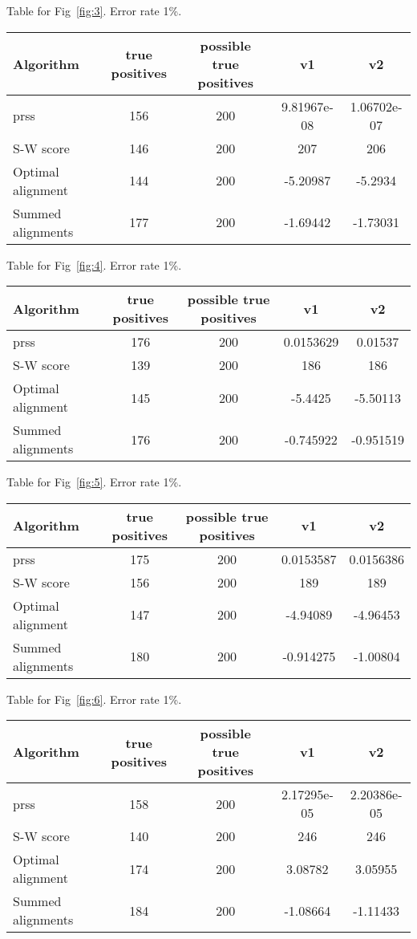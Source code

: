 \documentclass[a4paper,10pt,oneside]{article}
\begin{document}
Table for Fig~\ref{fig:3}. Error rate 1\%.
\begin{tabular}{|l|c|c|c|c|} \hline
Algorithm & true positives & possible true positives & v1 & v2 \\ \hline
prss & 156 & 200 & 9.81967e-08 & 1.06702e-07 \\
S-W score & 146 & 200 & 207 & 206 \\
Optimal alignment & 144 & 200 & -5.20987 & -5.2934 \\
Summed alignments & 177 & 200 & -1.69442 & -1.73031 \\\hline
\end{tabular}

Table for Fig~\ref{fig:4}. Error rate 1\%.
\begin{tabular}{|l|c|c|c|c|} \hline
Algorithm & true positives & possible true positives & v1 & v2 \\ \hline
prss & 176 & 200 & 0.0153629 & 0.01537 \\
S-W score & 139 & 200 & 186 & 186 \\
Optimal alignment & 145 & 200 & -5.4425 & -5.50113 \\
Summed alignments & 176 & 200 & -0.745922 & -0.951519 \\\hline
\end{tabular}

Table for Fig~\ref{fig:5}. Error rate 1\%.
\begin{tabular}{|l|c|c|c|c|} \hline
Algorithm & true positives & possible true positives & v1 & v2 \\ \hline
prss & 175 & 200 & 0.0153587 & 0.0156386 \\
S-W score & 156 & 200 & 189 & 189 \\
Optimal alignment & 147 & 200 & -4.94089 & -4.96453 \\
Summed alignments & 180 & 200 & -0.914275 & -1.00804 \\\hline
\end{tabular}

Table for Fig~\ref{fig:6}. Error rate 1\%.
\begin{tabular}{|l|c|c|c|c|} \hline
Algorithm & true positives & possible true positives & v1 & v2 \\ \hline
prss & 158 & 200 & 2.17295e-05 & 2.20386e-05 \\
S-W score & 140 & 200 & 246 & 246 \\
Optimal alignment & 174 & 200 & 3.08782 & 3.05955 \\
Summed alignments & 184 & 200 & -1.08664 & -1.11433 \\\hline
\end{tabular}
\end{document}
